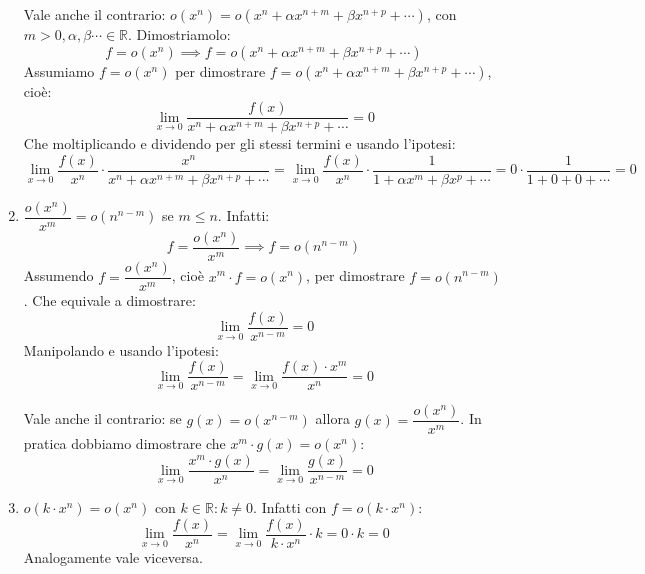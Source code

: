\begin{enumerate}
		Vale anche il contrario: $o(x^n) = o(x^n + \alpha x^{n+m} + \beta x^{n + p} + \cdots)$, con $m > 0, \alpha, \beta \cdots \in \mathbb{R}$. Dimostriamolo:
		\begin{equation*}
			f = o(x^n) \implies f = o(x^n + \alpha x^{n+m} + \beta x^{n + p} + \cdots)
		\end{equation*}
		Assumiamo $f = o(x^n)$ per dimostrare $f = o(x^n + \alpha x^{n+m} + \beta x^{n + p} + \cdots)$, cioè:
		\begin{equation*}
			\lim_{x \to 0} \dfrac{f(x)}{x^n + \alpha x^{n+m} + \beta x^{n + p} + \cdots} = 0
		\end{equation*}
		Che moltiplicando e dividendo per gli stessi termini e usando l'ipotesi:
		\begin{equation*}
			\lim_{x \to 0} \dfrac{f(x)}{x^n} \cdot \dfrac{x^n}{x^n + \alpha x^{n+m} + \beta x^{n + p} + \cdots} = \lim_{x \to 0} \dfrac{f(x)}{x^n} \cdot \dfrac{1}{1 + \alpha x^{m} + \beta x^{p} + \cdots} = 0 \cdot \dfrac{1}{1 + 0 + 0 + \cdots} = 0
		\end{equation*}

	\item $\dfrac{o(x^n)}{x^m} = o(n^{n-m})$ se $m \leq n$. Infatti:
		\begin{equation*}
			f = \dfrac{o(x^n)}{x^m} \implies f = o(n^{n-m})
		\end{equation*}
		Assumendo $f = \dfrac{o(x^n)}{x^m}$, cioè $x^m \cdot f = o(x^n)$, per dimostrare $f = o(n^{n-m})$. Che equivale a dimostrare:
		\begin{equation*}
			\lim_{x \to 0} \dfrac{f(x)}{x^{n-m}} = 0
		\end{equation*}
		Manipolando e usando l'ipotesi:
		\begin{equation*}
			\lim_{x \to 0} \dfrac{f(x)}{x^{n-m}} = \lim_{x \to 0} \dfrac{f(x) \cdot x^m}{x^n} = 0 %
		\end{equation*}

		Vale anche il contrario: se $g(x) = o(x^{n-m})$ allora $g(x) = \dfrac{o(x^n)}{x^m}$. In pratica dobbiamo dimostrare che $x^m \cdot g(x) = o(x^n)$:
		\begin{equation*}
			\lim_{x \to 0} \dfrac {x^m \cdot g(x)}{x^n} = \lim_{x \to 0} \dfrac{g(x)}{x^{n-m}} = 0
		\end{equation*}

	\item $o(k \cdot x^n) = o(x^n)$ con $k \in \mathbb{R}: k \neq 0$. Infatti con $f=o(k\cdot x^n)$:
		\begin{equation*}
			\lim_{x \to 0} \dfrac{f(x)}{x^n} = \lim_{x \to 0} \dfrac{f(x)}{k \cdot x^n} \cdot k = 0 \cdot k = 0
		\end{equation*}
		Analogamente vale viceversa.


\end{enumerate}

